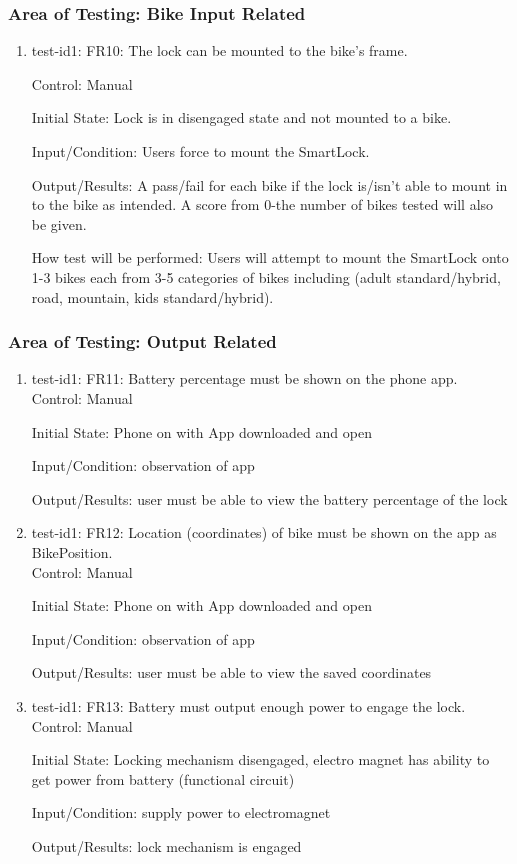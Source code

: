 \documentclass[12pt, titlepage]{article}
\begin{document}
\subsubsection{Area of Testing: Bike Input Related}

\begin{enumerate}

\item{test-id1: FR10: The lock can be mounted to the bike’s frame. \\}

Control: Manual

Initial State: Lock is in disengaged state and not mounted to a bike.

Input/Condition: Users force to mount the SmartLock.

Output/Results: A pass/fail for each bike if the lock is/isn’t able to mount in to the bike as intended. A score from 0-the number of bikes tested will also be given.

How test will be performed: Users will attempt to mount the SmartLock onto 1-3 bikes each from 3-5 categories of bikes including (adult standard/hybrid, road, mountain, kids standard/hybrid).

\end{enumerate}

\subsubsection{Area of Testing: Output Related}

\begin{enumerate}

\item{test-id1: FR11: Battery percentage must be shown on the phone app. \\}
Control: Manual 

Initial State: Phone on with App downloaded and open 

Input/Condition: observation of app 

Output/Results: user must be able to view the battery percentage of the lock 

\item{test-id1: FR12: Location (coordinates) of bike must be shown on the app as BikePosition. \\}
Control: Manual 

Initial State: Phone on with App downloaded and open 

Input/Condition: observation of app 

Output/Results: user must be able to view the saved coordinates 

\item{test-id1: FR13: Battery must output enough power to engage the lock. \\}
Control: Manual 

Initial State: Locking mechanism disengaged, electro magnet has ability to get power from battery (functional circuit) 

Input/Condition: supply power to electromagnet 

Output/Results: lock mechanism is engaged 

\end{enumerate}
\end{document}
